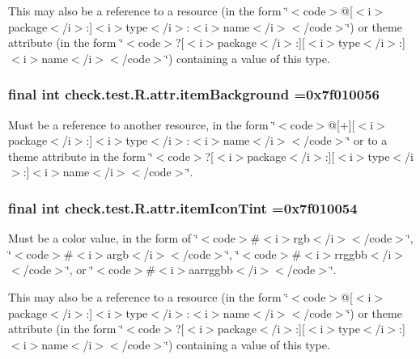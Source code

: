 This may also be a reference to a resource (in the form \char`\"{}$<$code$>$@\mbox{[}$<$i$>$package$<$/i$>$\+:\mbox{]}$<$i$>$type$<$/i$>$\+:$<$i$>$name$<$/i$>$$<$/code$>$\char`\"{}) or theme attribute (in the form \char`\"{}$<$code$>$?\mbox{[}$<$i$>$package$<$/i$>$\+:\mbox{]}\mbox{[}$<$i$>$type$<$/i$>$\+:\mbox{]}$<$i$>$name$<$/i$>$$<$/code$>$\char`\"{}) containing a value of this type. \hypertarget{classcheck_1_1test_1_1_r_1_1attr_a11b086908d75b84fb5b23568084c00d8}{}
\subsubsection[{item\+Background}]{\setlength{\rightskip}{0pt plus 5cm}final int check.\+test.\+R.\+attr.\+item\+Background =0x7f010056\hspace{0.3cm}{\ttfamily [static]}}\label{classcheck_1_1test_1_1_r_1_1attr_a11b086908d75b84fb5b23568084c00d8}
Must be a reference to another resource, in the form \char`\"{}$<$code$>$@\mbox{[}+\mbox{]}\mbox{[}$<$i$>$package$<$/i$>$\+:\mbox{]}$<$i$>$type$<$/i$>$\+:$<$i$>$name$<$/i$>$$<$/code$>$\char`\"{} or to a theme attribute in the form \char`\"{}$<$code$>$?\mbox{[}$<$i$>$package$<$/i$>$\+:\mbox{]}\mbox{[}$<$i$>$type$<$/i$>$\+:\mbox{]}$<$i$>$name$<$/i$>$$<$/code$>$\char`\"{}. \hypertarget{classcheck_1_1test_1_1_r_1_1attr_afb89a06e82ef49ce6b57555061f15032}{}
\subsubsection[{item\+Icon\+Tint}]{\setlength{\rightskip}{0pt plus 5cm}final int check.\+test.\+R.\+attr.\+item\+Icon\+Tint =0x7f010054\hspace{0.3cm}{\ttfamily [static]}}\label{classcheck_1_1test_1_1_r_1_1attr_afb89a06e82ef49ce6b57555061f15032}
Must be a color value, in the form of \char`\"{}$<$code$>$\#$<$i$>$rgb$<$/i$>$$<$/code$>$\char`\"{}, \char`\"{}$<$code$>$\#$<$i$>$argb$<$/i$>$$<$/code$>$\char`\"{}, \char`\"{}$<$code$>$\#$<$i$>$rrggbb$<$/i$>$$<$/code$>$\char`\"{}, or \char`\"{}$<$code$>$\#$<$i$>$aarrggbb$<$/i$>$$<$/code$>$\char`\"{}. 

This may also be a reference to a resource (in the form \char`\"{}$<$code$>$@\mbox{[}$<$i$>$package$<$/i$>$\+:\mbox{]}$<$i$>$type$<$/i$>$\+:$<$i$>$name$<$/i$>$$<$/code$>$\char`\"{}) or theme attribute (in the form \char`\"{}$<$code$>$?\mbox{[}$<$i$>$package$<$/i$>$\+:\mbox{]}\mbox{[}$<$i$>$type$<$/i$>$\+:\mbox{]}$<$i$>$name$<$/i$>$$<$/code$>$\char`\"{}) containing a value of this type. \hypertarget{classcheck_1_1test_1_1_r_1_1attr_ab2727a6858d6de3d85c2cb2ca13fde08}{}
